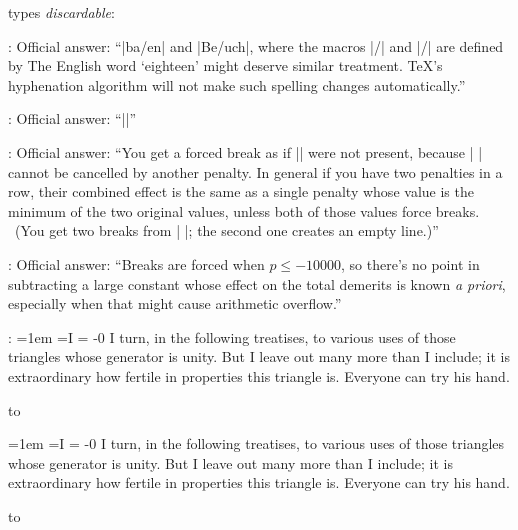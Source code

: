 \noindent\item{} types {\it discardable}:

\myhr

:
Official answer: ``|ba\ck/en| and |Be\ttt/uch|, where the macros |\ck/| and |\ttt/|
are defined by
\begintt
\def\ck/{\discretionary{k-}{k}{ck}}
\def\ttt/{tt\discretionary{-}{t}{}}
\endtt
The English word `eighteen' might deserve similar treatment.
\TeX's hyphenation algorithm will not make such spelling changes automatically.''

:
Official answer: ``|\def\break{\penalty-10000 }|''

:
Official answer: ``You get a forced break as if\/ |\nobreak| were not
present, because |\break| cannot be cancelled by another penalty. In
general if you have two penalties in a row, their combined effect is
the same as a single penalty whose value is the minimum of the two
original values, unless both of those values force breaks. \ (You get
two breaks from |\break\break|; the second one creates an empty
line.)''

:
Official answer: ``Breaks are forced when $p\le-10000$, so there's no
point in subtracting a large constant whose effect on the total
demerits is known {\sl a priori}, especially when that might cause
arithmetic overflow.''

:
\begintt
\newdimen\x
\x=1em
=\hbox{I}
=\vbox{ -0\x
  \ifdim \x>2em \rightskip=-\wd1
  \else \frenchspacing \rightskip=-\wd1 plus1pt minus1pt
   \leftskip=0pt plus 1pt minus1pt \fi
  \parfillskip=0pt  \noindent
I turn, in the following treatises, to various uses of those triangles
whose generator is unity. But I leave out many more than I include; it
is extraordinary how fertile in properties this triangle is. Everyone
can try his hand.}
\centerline{\hbox to }
\endtt
\newdimen\x
\x=1em
=\hbox{I}
=\vbox{ -0\x
  \ifdim \x>2em \rightskip=-\wd1
  \else \frenchspacing \rightskip=-\wd1 plus1pt minus1pt
   \leftskip=0pt plus 1pt minus1pt \fi
  \parfillskip=0pt  \noindent
I turn, in the following treatises, to various uses of those triangles
whose generator is unity. But I leave out many more than I include; it
is extraordinary how fertile in properties this triangle is. Everyone
can try his hand.}
\centerline{\hbox to }

